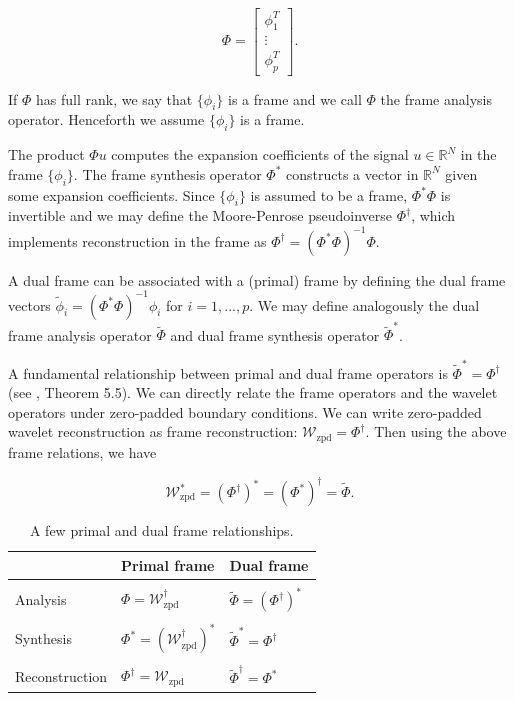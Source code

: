 \documentclass[journal]{IEEEtran}
\newcommand{\reals}{\mathbb{R}}
\newcommand{\dual}{\widetilde}
\begin{document}
\[ \Phi = \begin{bmatrix}\phi_1^T\\\vdots\\\phi_p^T\end{bmatrix}. \] 

   \noindent If $\Phi$ has full rank, we say that $\{\phi_i\}$ is a frame and we call $\Phi$ the frame analysis operator.  Henceforth we assume $\{\phi_i\}$ is a frame.
   
   The product $\Phi u$ computes the expansion coefficients of the signal ${u\in\reals^N}$ in the frame $\{\phi_i\}$.  The frame synthesis operator $\Phi^\ast$ constructs a vector in $\reals^N$ given some expansion coefficients.  Since $\{\phi_i\}$ is assumed to be a frame, $\Phi^\ast\Phi$ is invertible and we may define the Moore-Penrose pseudoinverse $\Phi^\dagger$, which implements reconstruction in the frame as $\Phi^\dagger=\left(\Phi^\ast\Phi\right)^{-1}\Phi$.

   A dual frame can be associated with a (primal) frame by defining the dual frame vectors $\dual{\phi}_i = \left(\Phi^\ast\Phi\right)^{-1}\phi_i$ for $i=1,...,p$.  We may define analogously the dual frame analysis operator $\dual{\Phi}$ and dual frame synthesis operator $\dual{\Phi}^\ast$.

   \noindent A fundamental relationship between primal and dual frame operators is $\dual{\Phi}^\ast = \Phi^\dagger$ (see \cite{mallat_2009}, Theorem 5.5).  We can directly relate the frame operators and the wavelet operators under zero-padded boundary conditions.  We can write zero-padded wavelet reconstruction as frame reconstruction: $\mathcal{W}_\text{zpd}=\Phi^\dagger$.  Then using the above frame relations, we have

   \begin{equation}
      \label{eq:wave_dual_frame}
      \mathcal{W}_\text{zpd}^\ast = \left(\Phi^\dagger\right)^\ast = \left(\Phi^\ast\right)^\dagger = \dual{\Phi}.
   \end{equation}

\begin{table}[ht]
   \centering
   \caption{A few primal and dual frame relationships.}
   \label{tab:frame_relations}
   \begin{tabular}{lll}
      &Primal frame&Dual frame\\\hline\\[-0.5em]
      Analysis & $\Phi = \mathcal{W}_\text{zpd}^\dagger$ & $\dual{\Phi}=\left(\Phi^\dagger\right)^\ast$\\\\[-0.5em]
      Synthesis & $\Phi^\ast = \left(\mathcal{W}_\text{zpd}^\dagger\right)^\ast$ & $\dual{\Phi}^\ast = \Phi^\dagger$ \\\\[-0.5em]
      Reconstruction & $\Phi^\dagger = \mathcal{W}_\text{zpd}$ & $\dual{\Phi}^\dagger = \Phi^\ast$
   \end{tabular}
\end{table}
\end{document}
